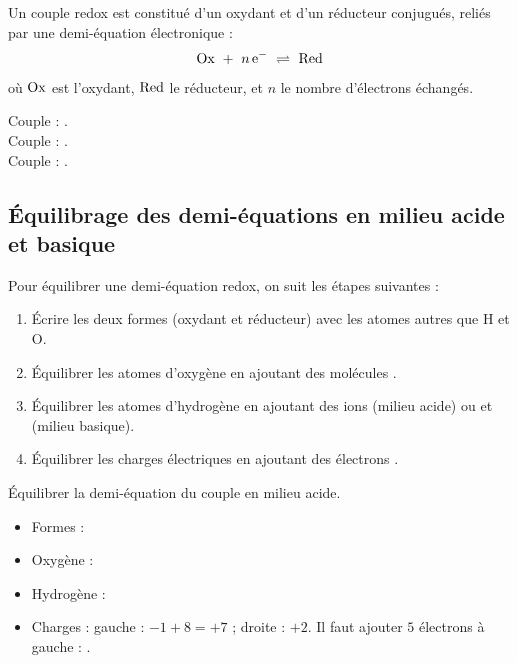 \begin{definition}
Un couple redox est constitué d'un oxydant et d'un réducteur conjugués, reliés par une demi-équation électronique :
\[
\ox \ + \ n\,\ce{e-} \ \rightleftharpoons \ \red
\]
où $\mathrm{Ox}$ est l'oxydant, $\mathrm{Red}$ le réducteur, et $n$ le nombre d'électrons échangés.
\end{definition}

\begin{exemple}
Couple  : .\\
Couple  : .\\
Couple  : .
\end{exemple}

\subsection{Équilibrage des demi-équations en milieu acide et basique}

\begin{propriete}
Pour équilibrer une demi-équation redox, on suit les étapes suivantes :
\begin{enumerate}
    \item Écrire les deux formes (oxydant et réducteur) avec les atomes autres que H et O.
    \item Équilibrer les atomes d'oxygène en ajoutant des molécules .
    \item Équilibrer les atomes d'hydrogène en ajoutant des ions  (milieu acide) ou  et  (milieu basique).
    \item Équilibrer les charges électriques en ajoutant des électrons .
\end{enumerate}
\end{propriete}

\begin{exemple}
Équilibrer la demi-équation du couple  en milieu acide.
\begin{itemize}
    \item Formes : 
    \item Oxygène : 
    \item Hydrogène : 
    \item Charges : gauche : $-1 + 8 = +7$ ; droite : $+2$. Il faut ajouter $5$ électrons à gauche : .
\end{itemize}
\end{exemple}

